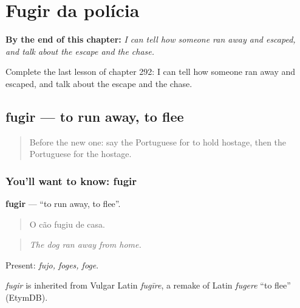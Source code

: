 
\chapter{Fugir da polícia}
\label{ch:pt-fugir-da-policia}

\begin{chapteropening}
\textbf{By the end of this chapter:} \emph{I can tell how someone ran away and escaped, and talk about the escape and the chase.}

Complete the last lesson of chapter 292: I can tell how someone ran away and escaped, and talk about the escape and the chase.
\end{chapteropening}

\section[fugir]{fugir — to run away, to flee}

\label{lesson:PT-C292-fugir}



\begin{quote}
Before the new one: say the Portuguese for to hold hostage, then the Portuguese for the hostage.
\end{quote}

\subsection*{You'll want to know: fugir}
\textbf{fugir} — \textquotedblleft{}to run away, to flee\textquotedblright{}.

\begin{quote}
O cão fugiu de casa.
\end{quote}

\begin{quote}
\emph{The dog ran away from home.}
\end{quote}

Present: \emph{fujo, foges, foge}.

\begin{cousinweb}
\emph{fugir} is inherited from Vulgar Latin \emph{fugīre}, a remake of Latin \emph{fugere} \textquotedblleft{}to flee\textquotedblright{} (EtymDB).
\end{cousinweb}

